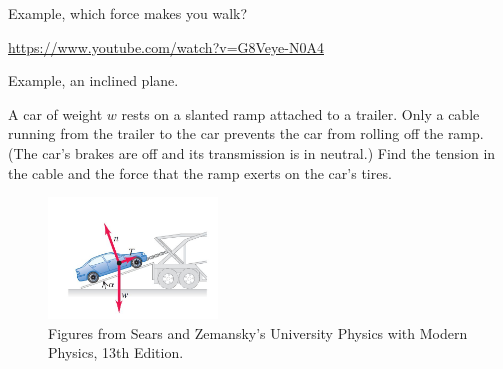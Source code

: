 \documentclass[]{beamer}
\begin{document}
    \begin{frame}
 Example, which force makes you walk? 
 \vspace{3mm}

 \url{https://www.youtube.com/watch?v=G8Veye-N0A4}

      \end{frame}







    \begin{frame}
Example, an inclined plane.
\vspace{3mm}


A car of weight $w$ rests on a slanted ramp attached to a trailer.
 Only a cable running from the trailer to the car prevents
the car from rolling off the ramp. (The car’s brakes are off and its transmission is in neutral.) Find the tension in the cable
and the force that the ramp exerts on the car’s tires.


\begin{figure}[h!]  
  \includegraphics[width=0.4\textwidth]{images/f16.jpg}
  \caption{ {\tiny Figures from Sears and Zemansky's University Physics 
  with Modern Physics, 13th Edition.} }
\end{figure}



      \end{frame}



\end{document}
